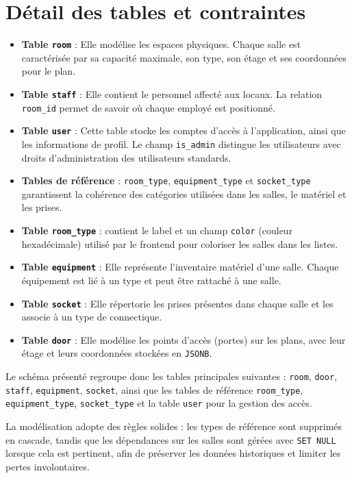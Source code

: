 \section{Détail des tables et contraintes}
\begin{itemize}
    \item \textbf{Table \texttt{room}} : Elle modélise les espaces physiques. Chaque salle est caractérisée par sa capacité maximale, son type, son étage et ses coordonnées pour le plan.
    \item \textbf{Table \texttt{staff}} : Elle contient le personnel affecté aux locaux. La relation \texttt{room\_id} permet de savoir où chaque employé est positionné.
    \item \textbf{Table \texttt{user}} : Cette table stocke les comptes d'accès à l'application, ainsi que les informations de profil. Le champ \texttt{is\_admin} distingue les utilisateurs avec droits d'administration des utilisateurs standards.
    \item \textbf{Tables de référence} : \texttt{room\_type}, \texttt{equipment\_type} et \texttt{socket\_type} garantissent la cohérence des catégories utilisées dans les salles, le matériel et les prises.
    \item \textbf{Table \texttt{room\_type}} : contient le label et un champ \texttt{color} (couleur hexadécimale) utilisé par le frontend pour coloriser les salles dans les listes.
    \item \textbf{Table \texttt{equipment}} : Elle représente l'inventaire matériel d'une salle. Chaque équipement est lié à un type et peut être rattaché à une salle.
    \item \textbf{Table \texttt{socket}} : Elle répertorie les prises présentes dans chaque salle et les associe à un type de connectique.
    \item \textbf{Table \texttt{door}} : Elle modélise les points d'accès (portes) sur les plans, avec leur étage et leurs coordonnées stockées en \texttt{JSONB}.
\end{itemize}

Le schéma présenté regroupe donc les tables principales suivantes : \texttt{room}, \texttt{door}, \texttt{staff}, \texttt{equipment}, \texttt{socket}, ainsi que les tables de référence \texttt{room\_type}, \texttt{equipment\_type}, \texttt{socket\_type} et la table \texttt{user} pour la gestion des accès.

La modélisation adopte des règles solides : les types de référence sont supprimés en cascade, tandis que les dépendances sur les salles sont gérées avec \texttt{SET NULL} lorsque cela est pertinent, afin de préserver les données historiques et limiter les pertes involontaires.